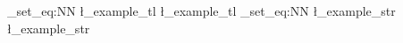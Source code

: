 \str_set_eq:NN  %
  \l_example_tl
  \l_example_tl
\tl_set_eq:NN  %
  \l_example_str
  \l_example_str
